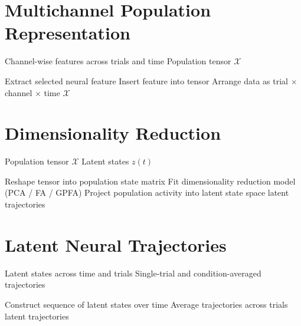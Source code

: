 \documentclass[11pt]{report}
\begin{document}
\section{Multichannel Population Representation}

\begin{algorithm}[H]
\caption{Population tensor construction}
\begin{algorithmic}[1]
\Require Channel-wise features across trials and time
\Ensure Population tensor $\mathcal{X}$

        \State Extract selected neural feature
        \State Insert feature into tensor
    \EndFor
\EndFor
\State Arrange data as trial $\times$ channel $\times$ time
\State \Return $\mathcal{X}$
\end{algorithmic}
\end{algorithm}

\section{Dimensionality Reduction}

\begin{algorithm}[H]
\caption{Latent state estimation}
\begin{algorithmic}[1]
\Require Population tensor $\mathcal{X}$
\Ensure Latent states $z(t)$

\State Reshape tensor into population state matrix
\State Fit dimensionality reduction model (PCA / FA / GPFA)
\State Project population activity into latent state space
\State \Return latent trajectories
\end{algorithmic}
\end{algorithm}

\section{Latent Neural Trajectories}

\begin{algorithm}[H]
\caption{Latent trajectory construction}
\begin{algorithmic}[1]
\Require Latent states across time and trials
\Ensure Single-trial and condition-averaged trajectories

    \State Construct sequence of latent states over time
\EndFor
{}
    \State Average trajectories across trials
\EndFor
\State \Return latent trajectories
\end{algorithmic}
\end{algorithm}
\end{document}
